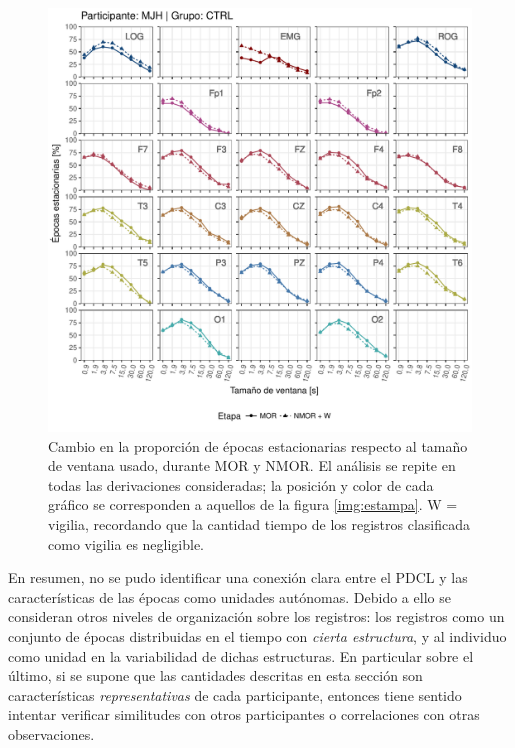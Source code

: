 \documentclass[12pt,letterpaper]{book}
\begin{document}
\begin{figure}
\centering
\includegraphics[width=\linewidth]{./scripts_graf_res/MJNNVIGILOS_cabeza_epocas_v2.pdf}
\caption{Cambio en la proporción de épocas estacionarias respecto al tamaño de ventana usado, durante MOR y NMOR. El análisis se repite en todas las derivaciones consideradas; la posición y color de cada gráfico se corresponden a aquellos de la figura \ref{img:estampa}. W = vigilia, recordando que la cantidad tiempo de los registros clasificada como vigilia es negligible.}
\label{cabeza_repoio}
\end{figure}

En resumen, no se pudo identificar una conexión clara entre el PDCL y las características de las épocas como unidades autónomas.
%
Debido a ello se consideran otros niveles de organización sobre los registros: los registros como un conjunto de épocas distribuidas en el tiempo con \textit{cierta estructura}, y al individuo como unidad en la variabilidad de dichas estructuras.
%
En particular sobre el último, si se supone que las cantidades descritas en esta sección son características \textit{representativas} de cada participante, entonces tiene sentido intentar verificar similitudes con otros participantes o correlaciones con otras observaciones.

\end{document}
